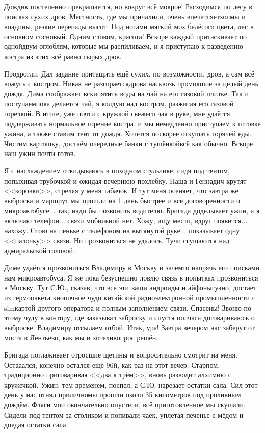 Дождик постепенно прекращается, но вокруг всё мокрое! Расходимся по лесу в поисках сухих дров. Местность, где мы причалили, очень впечатляет\mdash холмы и впадины, резкие перепады высот. Под ногами мягкий мох белёсого цвета, лес в основном сосновый. Одним словом, красота! Вскоре каждый притаскивает по одной\sdash двум оглоблям, которые мы распиливаем, и я приступаю к разведению костра из этих всё равно сырых дров. 

Продрогли. Дал задание притащить ещё сухих, по возможности, дров, а сам всё вожусь с костром. Никак не разгорается\mdash дрова насквозь промокшие за целый день дождя. Дима соображает вскипятить воды на чай на его газовой плитке. Так и поступаем\mdash пока делается чай, я колдую над костром, разжигая его газовой горелкой. В итоге, уже почти с кружкой свежего чая в руке, мне удаётся поддерживать нормальное горение костра, и мы немедленно приступаем к готовке ужина, а также ставим тент от дождя. Хочется поскорее откушать горячей еды. Чистим картошку, достаём очередные банки с тушёнкой\mdash всё как обычно. Вскоре наш ужин почти готов. 

Я с наслаждением откидываюсь в походном стульчике, сидя под тентом, попыхивая трубочкой и ожидая вечернюю похлебку. Паша и Геннадич крутят <<коровки>>, стреляя у меня табачок. И тут меня осеняет, что завтра же выброска и маршрут мы прошли на 1 день быстрее и все договоренности о микроавтобусе$\ldots$ так, надо бы позвонить водителю. Бригада доделывает ужин, а я включаю телефон$\ldots$ связи мобильной нет. Хожу, ищу место, вдруг появится$\ldots$ нахожу. Стою на пеньке с телефоном на вытянутой руке$\ldots$ показывает одну <<палочку>> связи. Но прозвониться не удалось. Тучи сгущаются над адмиральской головой. 

Диме удаётся прозвониться Владимиру в Москву и зачем\sdash то напрячь его поисками нам микроавтобуса. Я же пока безуспешно ловлю связь в попытках прозвониться в Москву. Тут С.Ю., сказав, что все эти ваши андроиды и айфоны\mdash гуано, достает из гермопакета кнопочное чудо китайской радиоэлектронной промышленности с sim\sdash картой другого оператора и полным заполнением связи. Спасены! Звоню по этому чуду в контору, где заказывал заброску и спустя полчаса договариваюсь о выброске. Владимиру отсылаем отбой. Итак, ура! Завтра вечером нас заберут от моста в Лентьево, как мы и хотели\mdash вопрос решён.

Бригада поглаживает отросшие щетины и вопросительно смотрит на меня. Оста\sdash а\sdash ался, конечно остался ещё 96\sdash й, как раз на этот вечер. Старпом, традиционно приговаривая <<два к трём>>, вновь разводит алхимию с кружечкой. Ужин, тем временем, поспел, а С.Ю. нарезает остатки сала. Сил этот день у нас отнял прилично\mdash мы прошли около 35 километров под проливным дождём. Фляги мои окончательно опустели, всё приготовленное мы скушали. Сидели под тентом за столиком и попивали чаёк, уплетая печенье с мёдом и доедая остатки сала. 

